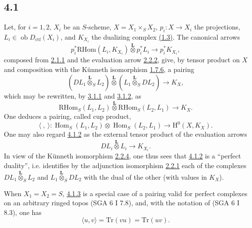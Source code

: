 \documentclass[11pt]{article}
\renewcommand{\H}{\mathrm{H}}
\DeclareMathOperator{\Hom}{Hom}
\newcommand{\ob}{\operatorname{ob}}
\providecommand{\RHom}{\mathrm{RHom}}
\providecommand{\Dctf}{D_{\mathrm{ctf}}}
\providecommand{\Dctf}{D_{\mathrm{ctf}}}
\providecommand{\RHom}{\mathrm{RHom}}
\providecommand{\Hom}{\operatorname{Hom}}
\providecommand{\ob}{\operatorname{ob}}
\providecommand{\RHom}{\mathrm R\mathcal{H}om}
\providecommand{\RHom}{\mathrm{RHom}}
\providecommand{\Hom}{\operatorname{Hom}}
\begin{document}
\subsection*{4.1}\label{sga5:III:subsection:4.1}
Let, for $i=1,2$, $X_i$ be an $S$-scheme, $X=X_1\times_SX_2$, $p_i:X\to X_i$ the projections, $L_i\in\ob\Dctf(X_i)$, and $K_{X_i}$ the dualizing complex \hyperref[sga5:III:subsection:1.3]{(1.3)}. The canonical arrows
\begin{equation}
p_i^*\RHom(L_i,K_{X_i})\overset{\mathbf L}{\otimes}p_i^*L_i
\longrightarrow p_i^*K_{X_i},
\tag{4.1.1}\label{sga5:III:equation:4.1.1}
\end{equation}
composed from \hyperref[sga5:III:equation:2.1.1]{2.1.1} and the evaluation arrow \hyperref[sga5:III:equation:2.2.2]{2.2.2}, give, by tensor product on $X$ and composition with the Künneth isomorphism \hyperref[sga5:III:equation:1.7.6]{1.7.6}, a pairing
\begin{equation}
(DL_1\overset{\mathbf L}{\otimes}_S L_2)\overset{\mathbf L}{\otimes}(L_1\overset{\mathbf L}{\otimes}_S DL_2)
\longrightarrow K_X,
\tag{4.1.2}\label{sga5:III:equation:4.1.2}
\end{equation}
which may be rewritten, by \hyperref[sga5:III:equation:3.1.1]{3.1.1} and \hyperref[sga5:III:equation:3.1.2]{3.1.2}, as
\begin{equation}
\RHom_S(L_1,L_2)\overset{\mathbf L}{\otimes}\RHom_S(L_2,L_1)
\longrightarrow K_X.
\tag{4.1.3}\label{sga5:III:equation:4.1.3}
\end{equation}
One deduces a pairing, called cup product,
\begin{equation}
\langle\ ,\ \rangle:\Hom_S(L_1,L_2)\otimes\Hom_S(L_2,L_1)
\longrightarrow \H^0(X,K_X).
\tag{4.1.4}\label{sga5:III:equation:4.1.4}
\end{equation}
One may also regard \hyperref[sga5:III:equation:4.1.2]{4.1.2} as the external tensor product of the evaluation arrows
\[
DL_i\overset{\mathbf L}{\otimes}L_i\longrightarrow K_{X_i}.
\]
In view of the Künneth isomorphism \hyperref[sga5:III:equation:2.2.4]{2.2.4}, one thus sees that \hyperref[sga5:III:equation:4.1.2]{4.1.2} is a ``perfect duality'', i.e. identifies by the adjunction isomorphism \hyperref[sga5:III:equation:2.2.1]{2.2.1} each of the complexes $DL_1\overset{\mathbf L}{\otimes}_S L_2$ and $L_1\overset{\mathbf L}{\otimes}_S DL_2$ with the dual of the other (with values in $K_X$).

When $X_1=X_2=S$, \hyperref[sga5:III:equation:4.1.3]{4.1.3} is a special case of a pairing valid for perfect complexes on an arbitrary ringed topos (SGA 6 I 7.8), and, with the notation of (SGA 6 I 8.3), one has
\begin{equation}
\langle u,v\rangle=\mathrm{Tr}(vu)=\mathrm{Tr}(uv).
\tag{4.1.5}\label{sga5:III:equation:4.1.5}
\end{equation}
\end{document}
